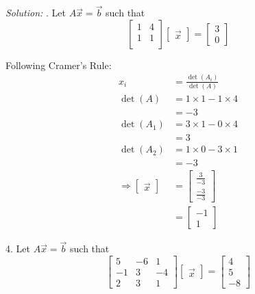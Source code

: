 \documentclass[11pt]{homework}
\begin{document}
\emph{Solution:}
. Let $A \vec x = \vec b$ such that
\begin{equation*}
  \begin{bmatrix}
  1 & 4 \\
  1 & 1 \\
  \end{bmatrix}
  \begin{bmatrix}
  \vec x
  \end{bmatrix}
  =
  \begin{bmatrix}
  3 \\
  0
  \end{bmatrix}
\end{equation*}

Following Cramer's Rule:
\begin{align*}
x_i &= \frac{\det (A_i)}{\det (A)} \\
\det(A)   &= 1 \times 1 - 1 \times 4 \\
          &= -3\\
\det(A_1) &= 3 \times 1 - 0 \times 4 \\
          &= 3 \\
\det(A_2) &= 1 \times 0 - 3 \times 1 \\
          &= -3 \\
\Rightarrow
\begin{bmatrix}
  \vec x
\end{bmatrix}
  &=
  \begin{bmatrix}
  \frac{ 3}{-3} \\
  \frac{ -3}{-3} 
  \end{bmatrix} \\
  &=
  \begin{bmatrix}
  -1 \\
  1
  \end{bmatrix}
\end{align*} 

4. Let $ A \vec x = \vec b$ such that
\begin{equation*}
  \begin{bmatrix}
  5 & -6 & 1 \\
  -1 & 3 & -4 \\
  2 & 3 & 1
  \end{bmatrix}
  \begin{bmatrix}
    \vec x
  \end{bmatrix}
  =
  \begin{bmatrix}
  4 \\
  5 \\
  -8 
  \end{bmatrix}
\end{equation*}
\end{document}
